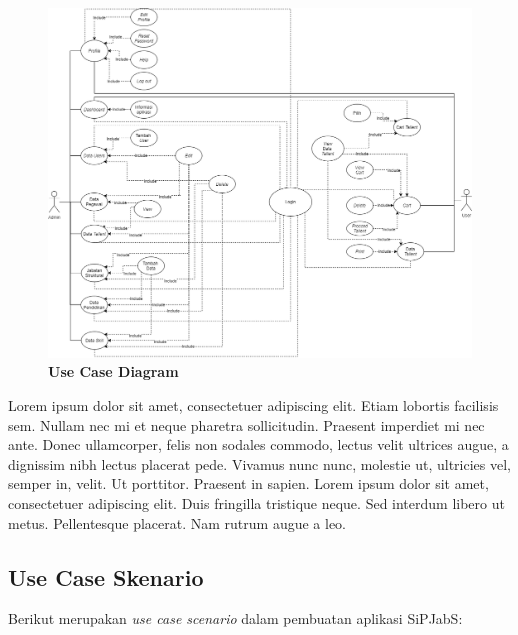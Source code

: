 \begin{figure}
	\centering
	\includegraphics[width=1\textwidth]
	{pics/diagram/usecase.png}
	\caption{\textbf{Use Case Diagram}}
	\label{fig:32}
\end{figure}

Lorem ipsum dolor sit amet, consectetuer adipiscing elit. Etiam lobortis facilisis sem.  Nullam nec mi et neque pharetra sollicitudin.  Praesent imperdiet  mi nec ante. Donec ullamcorper, felis non sodales commodo, lectus velit ultrices augue, a dignissim nibh lectus placerat pede. Vivamus nunc nunc, molestie ut, ultricies vel, semper in, velit. Ut porttitor. Praesent in sapien. Lorem ipsum dolor sit amet, consectetuer adipiscing elit. Duis fringilla tristique neque. Sed interdum libero ut metus. Pellentesque placerat.  Nam rutrum augue a leo.  

\subsection{Use Case Skenario}
Berikut merupakan \textit{use case scenario} dalam pembuatan aplikasi SiPJabS:

